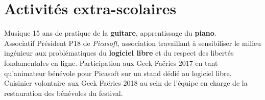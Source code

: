 \documentclass[letterpaper]{twentysecondcv} %
\begin{document}
\section{Activités extra-scolaires}
\begin{twenty}
	\twentyitem
    	{}
		{}
        {Musique}
        {}
        {}
        {15 ans de pratique de la \textbf{guitare}, apprentissage du \textbf{piano}.}
    \\
    \twentyitem
    	{}
		{}
        {Associatif}
        {}
        {}
        {Président P18 de \textit{Picasoft}, association travaillant à sensibiliser le milieu ingénieur aux problématiques du \textbf{logiciel libre} et du respect des libertés fondamentales en ligne. Participation aux Geek Faëries 2017 en tant qu'animateur bénévole pour Picasoft sur un stand dédié au logiciel libre.\\Cuisinier volontaire aux Geek Faëries 2018 au sein de l'équipe en charge de la restauration des bénévoles du festival.}
\end{twenty}
\end{document}
